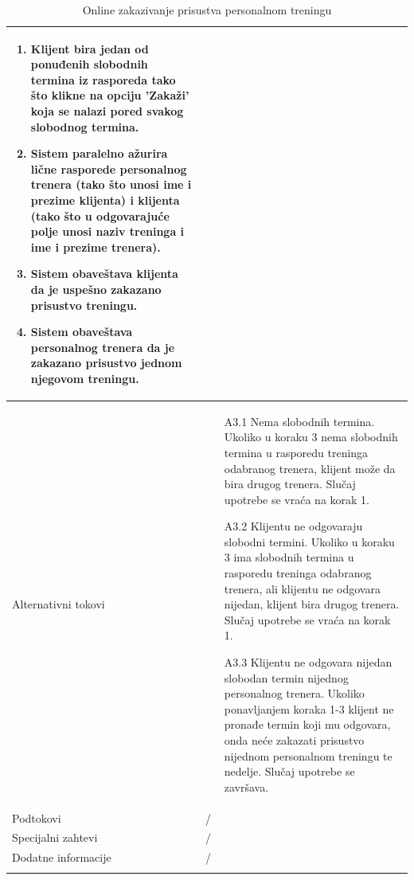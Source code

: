 \begin{longtable}{| p{} | p{} |}
\begin{enumerate}
    \item Klijent bira jedan od ponuđenih slobodnih termina iz rasporeda tako što klikne na opciju 'Zakaži' koja se nalazi pored svakog slobodnog termina.
    \item Sistem paralelno ažurira lične rasporede personalnog trenera (tako što unosi ime i prezime klijenta) i klijenta (tako što u odgovarajuće polje unosi naziv treninga i ime i prezime trenera).
    \item Sistem obaveštava klijenta da je uspešno zakazano prisustvo treningu.
    \item Sistem obaveštava personalnog trenera da je zakazano prisustvo jednom njegovom treningu.
   \end{enumerate} \\
\hline
    Alternativni tokovi & 
    \begin{itemize}
    \item[A3.1] Nema slobodnih termina. Ukoliko u koraku 3 nema slobodnih termina u rasporedu treninga odabranog trenera, klijent može da bira drugog trenera. Slučaj upotrebe se vraća na korak 1.
    \item[A3.2] Klijentu ne odgovaraju slobodni termini. Ukoliko u koraku 3 ima slobodnih termina u rasporedu treninga odabranog trenera, ali klijentu ne odgovara nijedan, klijent bira drugog trenera. Slučaj upotrebe se vraća na korak 1.
    \item[A3.3] Klijentu ne odgovara nijedan slobodan termin nijednog personalnog trenera. Ukoliko ponavljanjem koraka  1-3 klijent ne pronađe termin koji mu odgovara, onda neće zakazati prisustvo nijednom personalnom treningu te nedelje. Slučaj upotrebe se završava.
   \end{itemize} \\
\hline
    Podtokovi & /\\
\hline
    Specijalni zahtevi & /\\
\hline
    Dodatne informacije & / \\
\hline
\caption{ Online zakazivanje prisustva personalnom treningu}
\end{longtable}


